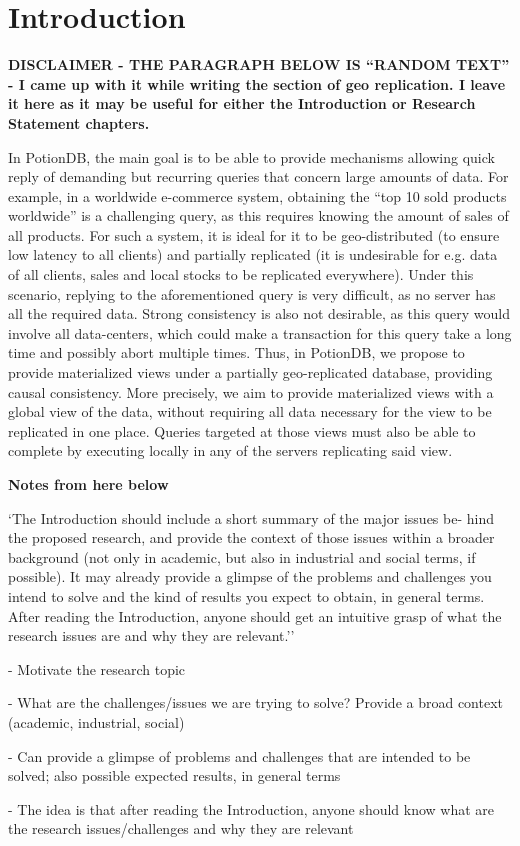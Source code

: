 
%

\chapter{Introduction}
\label{cha:introduction}

\textbf{DISCLAIMER - THE PARAGRAPH BELOW IS ``RANDOM TEXT'' - I came up with it while writing the section of geo replication. I leave it here as it may be useful for either the Introduction or Research Statement chapters.}

In PotionDB, the main goal is to be able to provide mechanisms allowing quick reply of demanding but recurring queries that concern large amounts of data.
For example, in a worldwide e-commerce system, obtaining the ``top 10 sold products worldwide'' is a challenging query, as this requires knowing the amount of sales of all products.
For such a system, it is ideal for it to be geo-distributed (to ensure low latency to all clients) and partially replicated (it is undesirable for e.g. data of all clients, sales and local stocks to be replicated everywhere).
Under this scenario, replying to the aforementioned query is very difficult, as no server has all the required data.
Strong consistency is also not desirable, as this query would involve all data-centers, which could make a transaction for this query take a long time and possibly abort multiple times.
Thus, in PotionDB, we propose to provide materialized views under a partially geo-replicated database, providing causal consistency.
More precisely, we aim to provide materialized views with a global view of the data, without requiring all data necessary for the view to be replicated in one place.
Queries targeted at those views must also be able to complete by executing locally in any of the servers replicating said view.

\textbf{Notes from here below}
	
	`The Introduction should include a short summary of the major issues be- hind the proposed research, and provide the context of those issues within a broader background (not only in academic, but also in industrial and social terms, if possible). It may already provide a glimpse of the problems and challenges you intend to solve and the kind of results you expect to obtain, in general terms. After reading the Introduction, anyone should get an intuitive grasp of what the research issues are and why they are relevant.''

- Motivate the research topic

- What are the challenges/issues we are trying to solve? Provide a broad context (academic, industrial, social)

- Can provide a glimpse of problems and challenges that are intended to be solved; also possible expected results, in general terms

- The idea is that after reading the Introduction, anyone should know what are the research issues/challenges and why they are relevant
